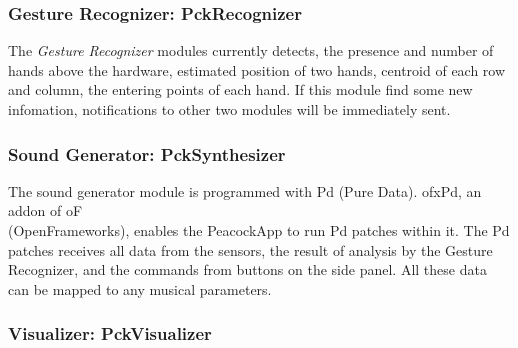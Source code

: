 \documentclass{nime-alternate}
\begin{document}
\subsubsection{Gesture Recognizer: PckRecognizer}

The {\it Gesture Recognizer} modules currently detects, the presence and number of hands above the hardware, estimated position of two hands, centroid of each row and column, the entering points of each hand. 
If this module find some new infomation, notifications to other two modules will be immediately sent.

\subsubsection{Sound Generator: PckSynthesizer}

The sound generator module is programmed with Pd (Pure Data)\cite{Pd}. ofxPd\cite{ofxPd}, an addon of oF\\(OpenFrameworks), enables the PeacockApp to run Pd patches within it. The Pd patches receives all data from the sensors, the result of analysis by the Gesture Recognizer, and the commands from buttons on the side panel. All these data can be mapped to any musical parameters.
 
\subsubsection{Visualizer: PckVisualizer}
\end{document}
